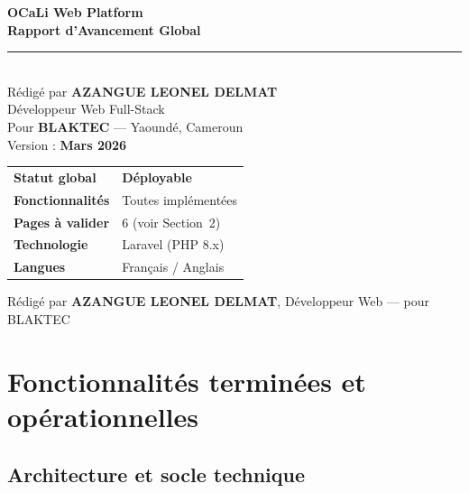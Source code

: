 \documentclass[12pt,a4paper]{article}
\begin{document}
\begin{titlepage}
  \centering
  \vspace*{3cm}

  {\Huge\bfseries\color{BleuOCaLi} OCaLi Web Platform}\\[0.6em]
  {\Large\bfseries\color{OrangeOCaLi} Rapport d'Avancement Global}\\[2em]

  \textcolor{GrisFonce}{\rule{10cm}{0.5pt}}\\[1.5em]

  {\large Rédigé par \textbf{AZANGUE LEONEL DELMAT}}\\[0.3em]
  {\large Développeur Web Full-Stack}\\[0.4em]
  {\large Pour \textbf{BLAKTEC} — Yaoundé, Cameroun}\\[0.4em]
  {\large Version : \textbf{Mars 2026}}\\[3em]

  \begin{center}
    \begin{tabular}{ll}
      \toprule
      \textbf{Statut global}      & \textcolor{Vert}{\textbf{Déployable}} \\
      \textbf{Fonctionnalités}    & Toutes implémentées \\
      \textbf{Pages à valider}    & 6 (voir Section~2) \\
      \textbf{Technologie}        & Laravel (PHP 8.x) \\
      \textbf{Langues}            & Français / Anglais \\
      \bottomrule
    \end{tabular}
  \end{center}

  \vfill
  {\small\textcolor{GrisFonce}{Rédigé par \textbf{AZANGUE LEONEL DELMAT}, Développeur Web — pour BLAKTEC}}
\end{titlepage}

\tableofcontents
\newpage

\section{Fonctionnalités terminées et opérationnelles}

\subsection{Architecture et socle technique}
\end{document}
